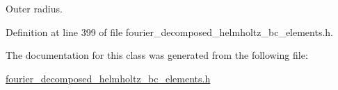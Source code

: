 Outer radius. 



Definition at line 399 of file fourier\+\_\+decomposed\+\_\+helmholtz\+\_\+bc\+\_\+elements.\+h.



The documentation for this class was generated from the following file\+:\begin{DoxyCompactItemize}
\item 
\hyperlink{fourier__decomposed__helmholtz__bc__elements_8h}{fourier\+\_\+decomposed\+\_\+helmholtz\+\_\+bc\+\_\+elements.\+h}\end{DoxyCompactItemize}
